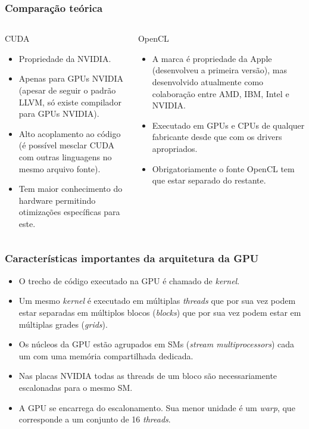\documentclass[brazil, 10pt]{beamer}
\begin{document}
\begin{frame}
  \frametitle{Comparação teórica}

\begin{columns}
  \begin{column}{.5\textwidth}
    CUDA
    
    \begin{itemize}
      \item Propriedade da NVIDIA.
      \item Apenas para GPUs NVIDIA (apesar de seguir o padrão LLVM, só existe compilador para GPUs NVIDIA).
      \item Alto acoplamento ao código (é possível mesclar CUDA com outras linguagens no mesmo arquivo fonte).
      \item Tem maior conhecimento do hardware permitindo otimizações específicas para este.
    \end{itemize}
  \end{column}
  \begin{column}{.5\textwidth}
    OpenCL    
    
    \begin{itemize}
      \item A marca é propriedade da Apple (desenvolveu a primeira versão), mas desenvolvido atualmente como colaboração entre AMD, IBM, Intel e NVIDIA.
      \item Executado em GPUs e CPUs de qualquer fabricante desde que com os drivers apropriados.
      \item Obrigatoriamente o fonte OpenCL tem que estar separado do restante.
    \end{itemize}
  \end{column}
\end{columns}
\end{frame}

\begin{frame}
  \frametitle{Características importantes da arquitetura da GPU}
  
  \begin{itemize}
    \item O trecho de código executado na GPU é chamado de \textit{kernel}.
    \item Um mesmo \textit{kernel} é executado em múltiplas \textit{threads} que por sua vez podem estar separadas em múltiplos blocos (\textit{blocks}) que por sua vez podem estar em múltiplas grades (\textit{grids}).
    \item Os núcleos da GPU estão agrupados em SMs (\textit{stream multiprocessors}) cada um com uma memória compartilhada dedicada.
    \item Nas placas NVIDIA todas as threads de um bloco são necessariamente escalonadas para o mesmo SM.
    \item A GPU se encarrega do escalonamento. Sua menor unidade é um \textit{warp}, que corresponde a um conjunto de 16 \textit{threads}.
  \end{itemize}
\end{frame}
\end{document}
